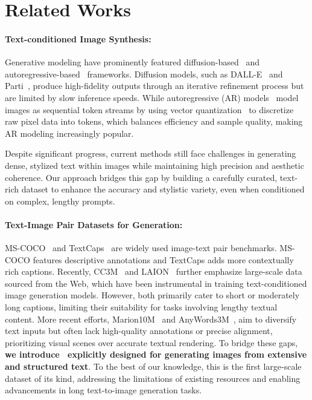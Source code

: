 \section{Related Works}
\label{sec:related_works}

\paragraph{Text-conditioned Image Synthesis:}
Generative modeling have prominently featured diffusion-based~\cite{song2019generative,ho2020denoising,ho2022classifier} and autoregressive-based~\cite{ramesh2021zero,esser2021taming} frameworks. Diffusion models, such as DALL-E~\cite{dalle} and Parti~\cite{parti}, produce high-fidelity outputs through an iterative refinement process but are limited by slow inference speeds. 
While autoregressive (AR) models~\cite{unifiedio2,emu,anygpt,llamagen} model images as sequential token streams by using vector quantization~\cite{van2017neural} to discretize raw pixel data into tokens, which balances efficiency and sample quality, making AR modeling increasingly popular.

Despite significant progress, current methods still face challenges in generating dense, stylized text within images while maintaining high precision and aesthetic coherence.
Our approach bridges this gap by building a carefully curated, text-rich dataset to enhance the accuracy and stylistic variety, even when conditioned on complex, lengthy prompts.


\paragraph{Text-Image Pair Datasets for Generation:}
MS-COCO~\cite{mscoco} and TextCaps~\cite{textcaps} are widely used image-text pair benchmarks.
MS-COCO features descriptive annotations and TextCaps adds more contextually rich captions.
Recently, CC3M~\cite{cc12m} and LAION~\cite{laion} further emphasize large-scale data sourced from the Web, which have been instrumental in training text-conditioned image generation models.
However, both primarily cater to short or moderately long captions, limiting their suitability for tasks involving lengthy textual content.
More recent efforts, Marion10M~\cite{textdiffuser} and AnyWords3M~\cite{anytext}, aim to diversify text inputs but often lack high-quality annotations or precise alignment, prioritizing visual scenes over accurate textual rendering.
To bridge these gaps, \textbf{we introduce \DatasetName~explicitly designed for generating images from extensive and structured text}. 
To the best of our knowledge, this is the first large-scale dataset of its kind, addressing the limitations of existing resources and enabling advancements in long text-to-image generation tasks.





